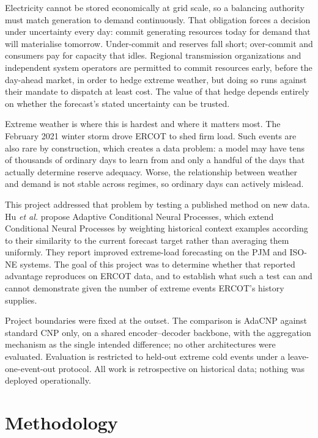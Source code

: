 \documentclass[12pt]{article} %
\begin{document}
Electricity cannot be stored economically at grid scale, so a balancing authority
must match generation to demand continuously. That obligation forces a decision
under uncertainty every day: commit generating resources today for demand that
will materialise tomorrow. Under-commit and reserves fall short; over-commit and
consumers pay for capacity that idles. Regional transmission organizations and
independent system operators are permitted to commit resources early, before the
day-ahead market, in order to hedge extreme weather, but doing so runs against
their mandate to dispatch at least cost. The value of that hedge depends entirely
on whether the forecast's stated uncertainty can be trusted.

Extreme weather is where this is hardest and where it matters most. The February
2021 winter storm drove ERCOT to shed firm load. Such events are also rare by
construction, which creates a data problem: a model may have tens of thousands of
ordinary days to learn from and only a handful of the days that actually
determine reserve adequacy. Worse, the relationship between weather and demand is
not stable across regimes, so ordinary days can actively mislead.

This project addressed that problem by testing a published method on new data. Hu
\emph{et al.}\cite{hu2026resilient} propose Adaptive Conditional Neural Processes,
which extend Conditional Neural Processes by weighting historical context
examples according to their similarity to the current forecast target rather than
averaging them uniformly. They report improved extreme-load forecasting on the
PJM and ISO-NE systems. The goal of this project was to determine whether that
reported advantage reproduces on ERCOT data, and to establish what such a test
can and cannot demonstrate given the number of extreme events ERCOT's history
supplies.

Project boundaries were fixed at the outset. The comparison is AdaCNP against
standard CNP only, on a shared encoder--decoder backbone, with the aggregation
mechanism as the single intended difference; no other architectures were
evaluated. Evaluation is restricted to held-out extreme cold events under a
leave-one-event-out protocol. All work is retrospective on historical data;
nothing was deployed operationally.

\section{Methodology}
\end{document}
